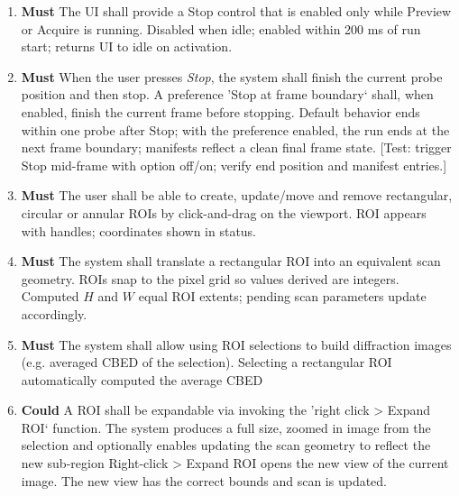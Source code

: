 \documentclass[10pt]{article}
\newcommand{\PriorityTag}[2]{%
  \colorbox{#2!25}{\footnotesize\textsf{\textbf{#1}}}\hspace{0.6em}}
\newcommand{\must}{\leavevmode\PriorityTag{Must}{green}}
\newcommand{\could}{\leavevmode\PriorityTag{Could}{cyan}}
\newcounter{reqgrp}[section] %
\newcounter{reqno}
\newcommand{\reqprefix}{GEN}
\newenvironment{requirements}[1]{%
  \renewcommand{\reqprefix}{#1}%
  \refstepcounter{reqgrp}%
  \setcounter{reqno}{0}%
  \begin{enumerate}[leftmargin=*]
}{\end{enumerate}}
\begin{document}
\begin{requirements}{UI}
  \item \must {}
  {The UI shall provide a Stop control that is enabled only while Preview or Acquire is running.}
  {Disabled when idle; enabled within 200 ms of run start; returns UI to idle on activation.}

  \item \must {}
  {When the user presses \emph{Stop}, the system shall finish the current probe position and then stop. A preference 'Stop at frame boundary` shall, when enabled, finish the current frame before stopping.}
  {Default behavior ends within one probe after Stop; with the preference enabled, the run ends at the next frame boundary; manifests reflect a clean final frame state.}
  [Test: trigger Stop mid-frame with option off/on; verify end position and manifest entries.]


  \item \label{req:ui:roi} \must {}
  {The user shall be able to create, update/move and remove rectangular, circular or annular ROIs by click-and-drag on the viewport.}
  {ROI appears with handles; coordinates shown in status.}

  \item \must {}
  {The system shall translate a rectangular ROI into an equivalent scan geometry. ROIs snap to the pixel grid so values derived are integers.}
  {Computed \(H\) and \(W\) equal ROI extents; pending scan parameters update accordingly.}

  \item \must {}
  {The system shall allow using ROI selections to build diffraction images (e.g. averaged CBED of the selection).}
  {Selecting a rectangular ROI automatically computed the average CBED}

  \item \could {}
  {A ROI shall be expandable via invoking the 'right click > Expand ROI` function. The system produces a full size, zoomed in image from the selection and optionally enables updating the scan geometry to reflect the new sub-region}
  {Right-click > Expand ROI opens the new view of the current image. The new view has the correct bounds and scan is updated.}


\end{requirements}
\end{document}
